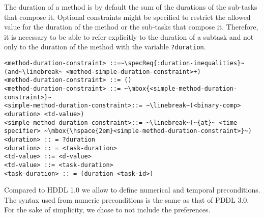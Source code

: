 \documentclass[letterpaper]{article} %
\begin{document}
%
%
The duration of a method is by default the sum of the durations of the sub-tasks that compose it. Optional constraints might be specified to restrict the allowed value for the
duration of the method or the sub-tasks that compose it. Therefore, it is necessary to be able to refer explicitly to the duration of a subtask and not only to the duration of the method with the variable {\tt ?duration}.

\begin{lstlisting}[firstnumber=last, escapechar=~]
<method-duration-constraint> ::=~\specReq{:duration-inequalities}~ (and~\linebreak~ <method-simple-duration-constraint>+)
<method-duration-constraint> ::= ()
<method-duration-constraint> ::= ~\mbox{<simple-method-duration-constraint>}~
<simple-method-duration-constraint>::= ~\linebreak~(<binary-comp> <duration> <td-value>)
<simple-method-duration-constraint>::= ~\linebreak~(~{at}~ <time-specifier> ~\mbox{\hspace{2em}<simple-method-duration-constraint>}~)
<duration> :: = ?duration
<duration> :: = <task-duration>
<td-value> ::= <d-value>
<td-value> ::= <task-duration>
<task-duration> :: = (duration <task-id>)
\end{lstlisting}

%
%
\noindent Compared to HDDL 1.0 we allow to define numerical and temporal preconditions. The syntax used from numeric preconditions is the same as that of PDDL 3.0. For the sake of simplicity, we chose to not include the preferences.
\end{document}
